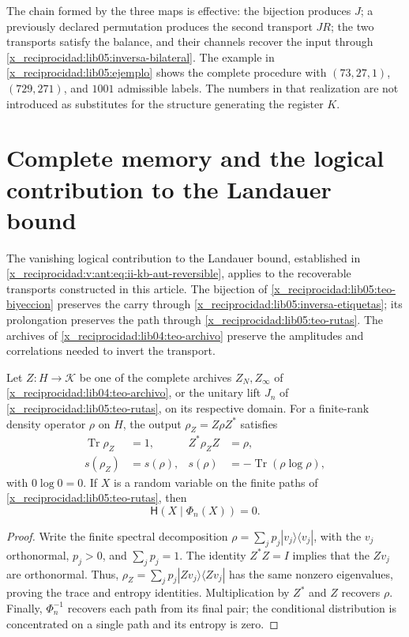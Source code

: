 The chain formed by the three maps is effective: the bijection
produces \(J\); a previously declared permutation produces the
second transport \(JR\); the two transports satisfy the
balance, and their channels recover the input through
\eqref{x_reciprocidad:lib05:inversa-bilateral}. The example in
\cref{x_reciprocidad:lib05:ejemplo} shows the complete procedure with
\((73,27,1)\), \((729,271)\), and \(1001\) admissible labels.
The numbers in that realization are not introduced as substitutes for
the structure generating the register \(K\).

\section{Complete memory and the logical contribution to the Landauer bound}
\label{x_reciprocidad:landauer:puente-archivo}

The vanishing logical contribution to the Landauer bound, established in
\eqref{x_reciprocidad:v:ant:eq:ii-kb-aut-reversible}, applies to the recoverable
transports constructed in this article. The bijection of
\cref{x_reciprocidad:lib05:teo-biyeccion} preserves the carry through
\eqref{x_reciprocidad:lib05:inversa-etiquetas}; its prolongation preserves the path
through \cref{x_reciprocidad:lib05:teo-rutas}. The archives of
\cref{x_reciprocidad:lib04:teo-archivo} preserve the amplitudes and correlations
needed to invert the transport.

\begin{corollary}
\label{x_reciprocidad:landauer:cor-archivo}
Let \(Z:H\to\mathcal K\) be one of the complete archives
\(Z_N,Z_\infty\) of \cref{x_reciprocidad:lib04:teo-archivo}, or the unitary
lift \(J_n\) of \cref{x_reciprocidad:lib05:teo-rutas}, on its respective domain.
For a finite-rank density operator \(\rho\) on \(H\),
the output \(\rho_Z=Z\rho Z^*\) satisfies
\begin{align}
 \operatorname{Tr}\rho_Z&=1,& Z^*\rho_ZZ&=\rho,\\
 s(\rho_Z)&=s(\rho),&
 s(\rho)&=-\operatorname{Tr}(\rho\log\rho),
 \label{x_reciprocidad:landauer:espectro}
\end{align}
with \(0\log0=0\). If \(X\) is a random variable on the finite
paths of \cref{x_reciprocidad:lib05:teo-rutas}, then
\begin{equation}
 \mathsf H(X\mid\Phi_n(X))=0.
 \label{x_reciprocidad:landauer:recuperacion-ruta}
\end{equation}
\end{corollary}
\begin{proof}
Write the finite spectral decomposition
\(\rho=\sum_jp_j|v_j\rangle\langle v_j|\), with the \(v_j\)
orthonormal, \(p_j>0\), and \(\sum_jp_j=1\). The identity
\(Z^*Z=I\) implies that the \(Zv_j\) are orthonormal. Thus,
\(\rho_Z=\sum_jp_j|Zv_j\rangle\langle Zv_j|\) has the same
nonzero eigenvalues, proving the trace and entropy identities.
Multiplication by \(Z^*\) and \(Z\) recovers \(\rho\). Finally,
\(\Phi_n^{-1}\) recovers each path from its final pair; the
conditional distribution is concentrated on a single path and its
entropy is zero.
\end{proof}

